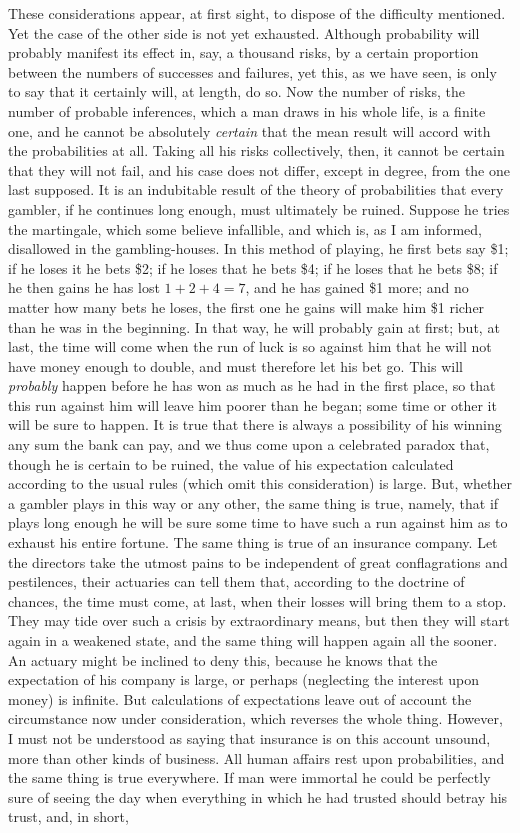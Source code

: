 These considerations appear, at first sight, to dispose of the difficulty mentioned. Yet the case of the other side is not yet exhausted. Although probability will probably manifest its effect in, say, a thousand risks, by a certain proportion between the numbers of successes and failures, yet this, as we have seen, is only to say that it certainly will, at length, do so. Now the number of risks, the number of probable inferences, which a man draws in his whole life, is a finite one, and he cannot be absolutely \emph{certain} that the mean result will accord with the probabilities at all. Taking all his risks collectively, then, it cannot be certain that they will not fail, and his case does not differ, except in degree, from the one last supposed. It is an indubitable result of the theory of probabilities that every gambler, if he continues long enough, must ultimately be ruined. Suppose he tries the martingale, which some believe infallible, and which is, as I am informed, disallowed in the gambling-houses. In this method of playing, he first bets say \$1; if he loses it he bets \$2; if he loses that he bets \$4; if he loses that he bets \$8; if he then gains he has lost $1+2+4=7$, and he has gained \$1 more; and no matter how many bets he loses, the first one he gains will make him \$1 richer than he was in the beginning. In that way, he will probably gain at first; but, at last, the time will come when the run of luck is so against him that he will not have money enough to double, and must therefore let his bet go. This will \emph{probably} happen before he has won as much as he had in the first place, so that this run against him will leave him poorer than he began; some time or other it will be sure to happen. It is true that there is always a possibility of his winning any sum the bank can pay, and we thus come upon a celebrated paradox that, though he is certain to be ruined, the value of his expectation calculated according to the usual rules (which omit this consideration) is large. But, whether a gambler plays in this way or any other, the same thing is true, namely, that if plays long enough he will be sure some time to have such a run against him as to exhaust his entire fortune. The same thing is true of an insurance company. Let the directors take the utmost pains to be independent of great conflagrations and pestilences, their actuaries can tell them that, according to the doctrine of chances, the time must come, at last, when their losses will bring them to a stop. They may tide over such a crisis by extraordinary means, but then they will start again in a weakened state, and the same thing will happen again all the sooner. An actuary might be inclined to deny this, because he knows that the expectation of his company is large, or perhaps (neglecting the interest upon money) is infinite. But calculations of expectations leave out of account the circumstance now under consideration, which reverses the whole thing. However, I must not be understood as saying that insurance is on this account unsound, more than other kinds of business. All human affairs rest upon probabilities, and the same thing is true everywhere. If man were immortal he could be perfectly sure of seeing the day when everything in which he had trusted should betray his trust, and, in short, 